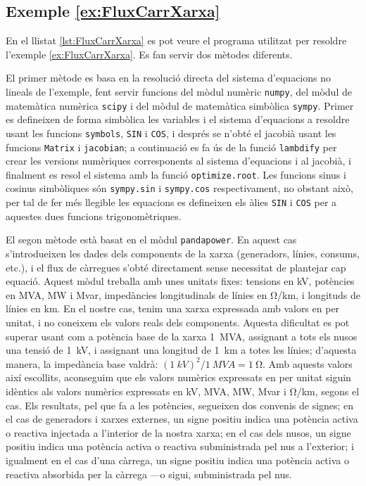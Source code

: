 \hypertarget{exemple:FluxCarrXarxa}{\subsection{Exemple \ref*{ex:FluxCarrXarxa} \FluxCarrXarxa}}
En el llistat \vref{lst:FluxCarrXarxa} es pot veure el programa utilitzat per resoldre l'exemple \vref{ex:FluxCarrXarxa}. Es fan servir dos mètodes diferents.

El primer mètode es basa en la resolució directa del sistema d'equacions no lineals de l'exemple, fent servir funcions del mòdul numèric \texttt{numpy}, del mòdul de matemàtica numèrica \texttt{scipy} i del mòdul de matemàtica simbòlica \texttt{sympy}. Primer es defineixen de forma simbòlica les variables i el sistema d'equacions a resoldre usant les funcions \texttt{symbols}, \texttt{SIN} i \texttt{COS}, i després se n'obté el jacobià usant les funcions \texttt{Matrix} i \texttt{jacobian}; a continuació es fa ús de la funció  \texttt{lambdify} per crear les versions numèriques corresponents al sistema d'equacions i al jacobià, i finalment es resol el sistema amb la funció \texttt{optimize.root}. Les funcions sinus i cosinus simbòliques són  \texttt{sympy.sin} i  \texttt{sympy.cos} respectivament, no obstant això,  per tal de fer més llegible les equacions es defineixen els àlies \texttt{SIN} i \texttt{COS} per a aquestes dues funcions trigonomètriques.

El segon mètode està basat en el mòdul \texttt{pandapower}. En aquest cas s'introdueixen les dades dels components de la xarxa (generadors, línies, consums, etc.), i el flux de càrregues s'obté directament sense necessitat de plantejar cap equació. Aquest mòdul treballa amb unes unitats fixes: tensions en  \unit{kV}, potències en  \unit{MVA}, \unit{MW} i \unit{Mvar}, impedàncies longitudinals de línies en \unit{\ohm/km}, i longituds de línies en  \unit{km}. En el nostre cas, tenim una xarxa expressada amb valors en per unitat, i no coneixem els valors reals dels components. Aquesta dificultat es pot superar usant com a potència base de la xarxa \qty{1}{MVA}, assignant a tots els nusos una tensió de \qty{1}{kV}, i assignant una longitud de \qty{1}{km} a totes les línies; d'aquesta manera, la impedància base valdrà: $(\qty{1}{kV})^2/\qty{1}{MVA} = \qty{1}{\ohm}$. Amb aquests valors així escollits, aconseguim que els valors numèrics expressats en per unitat siguin idèntics als valors numèrics expressats en 
\unit{kV},  \unit{MVA}, \unit{MW}, \unit{Mvar} i \unit{\ohm/km}, segons el cas. Els resultats, pel que fa a les potències,  segueixen dos convenis de signes; en el cas de generadors i xarxes externes, un signe positiu indica una potència activa o reactiva injectada a l'interior de la nostra xarxa; en el cas dels nusos, un signe positiu indica una potència activa o reactiva subministrada pel nus a l'exterior; i igualment en el cas d'una càrrega, un signe positiu indica una potència activa o reactiva absorbida per la càrrega ---o sigui, subministrada  pel nus.


